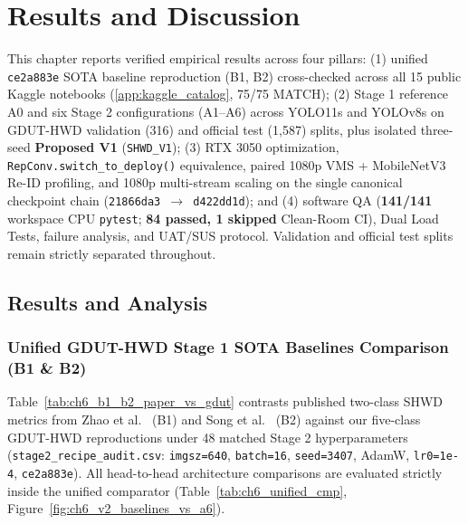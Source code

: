 \chapter{Results and Discussion}
\label{chap:results}

This chapter reports verified empirical results across four pillars: (1) unified \texttt{ce2a883e} SOTA baseline reproduction (B1, B2) cross-checked across all 15 public Kaggle notebooks (\ref{app:kaggle_catalog}, 75/75 MATCH); (2) Stage 1 reference A0 and six Stage 2 configurations (A1--A6) across YOLO11s and YOLOv8s on GDUT-HWD validation (316) and official test (1,587) splits, plus isolated three-seed \textbf{Proposed V1} (\texttt{SHWD\_V1}); (3) RTX 3050 optimization, \nolinkurl{RepConv.switch_to_deploy()} equivalence, paired 1080p VMS + MobileNetV3 Re-ID profiling, and 1080p multi-stream scaling on the single canonical checkpoint chain (\texttt{21866da3 $\to$ d422dd1d}); and (4) software QA (\textbf{141/141} workspace CPU \texttt{pytest}; \textbf{84 passed, 1 skipped} Clean-Room CI), Dual Load Tests, failure analysis, and UAT/SUS protocol. Validation and official test splits remain strictly separated throughout.

\section{Results and Analysis}

\subsection{Unified GDUT-HWD Stage 1 SOTA Baselines Comparison (B1 \& B2)}

Table~\ref{tab:ch6_b1_b2_paper_vs_gdut} contrasts published two-class SHWD metrics from Zhao et al.~\cite{zhao2025yolodcrcf} (B1) and Song et al.~\cite{song2024improved} (B2) against our five-class GDUT-HWD reproductions under 48 matched Stage 2 hyperparameters (\nolinkurl{stage2_recipe_audit.csv}: \texttt{imgsz=640}, \texttt{batch=16}, \texttt{seed=3407}, AdamW, \texttt{lr0=1e-4}, \texttt{ce2a883e}). All head-to-head architecture comparisons are evaluated strictly inside the unified comparator (Table~\ref{tab:ch6_unified_cmp}, Figure~\ref{fig:ch6_v2_baselines_vs_a6}).

